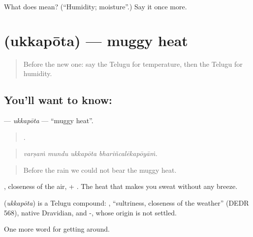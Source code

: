 \begin{tcolorbox}[breakable,colback=teal!4,colframe=teal!35!black,title={Before you move on}]
What does  mean? (\textquotedblleft{}Humidity; moisture\textquotedblright{}.) Say it once more.
\end{tcolorbox}
\section[\texorpdfstring{\te{ఉక్కపోత} (ukkapōta)}{ఉక్కపోత (ukkapōta)}]{ (ukkapōta) — muggy heat}

\label{lesson:TE-C476-ukkapota}



\begin{quote}
Before the new one: say the Telugu for temperature, then the Telugu for humidity.
\end{quote}

\subsection*{You'll want to know: }
\textbf{} — \emph{ukkapōta} — \textquotedblleft{}muggy heat\textquotedblright{}.

\begin{quote}
   .
\end{quote}

\begin{quote}
\emph{varṣaṁ mundu ukkapōta bhariñcalēkapōyāṁ.}
\end{quote}

\begin{quote}
Before the rain we could not bear the muggy heat.
\end{quote}

, closeness of the air, + . The heat that makes you sweat without any breeze.

\begin{cousinweb}
\textbf{} (\emph{ukkapōta}) is a Telugu compound: , \textquotedblleft{}sultriness, closeness of the weather\textquotedblright{} (DEDR 568), native Dravidian, and -, whose origin is not settled.
\end{cousinweb}

\begin{grammarlens}[title={What you've built}]
One more word for getting around.
\end{grammarlens}

